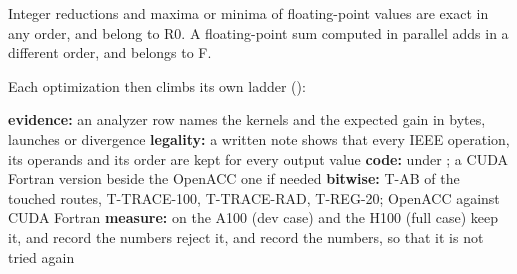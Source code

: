 Integer reductions and maxima or minima of floating-point values are exact in any order, and belong to R0. A
floating-point sum computed in parallel adds in a different order, and belongs to F.

Each optimization then climbs its own ladder ():
\begin{algorithm}[ht]
\caption{The optimization ladder of Stage 6.}
\label{alg:optladder}
\begin{algorithmic}[1]
\State \textbf{evidence:} an analyzer row names the kernels and the expected gain in bytes, launches or divergence
\State \textbf{legality:} a written note shows that every IEEE operation, its operands and its order are kept for every output value
\State \textbf{code:} under ; a CUDA Fortran version beside the OpenACC one if needed
\State \textbf{bitwise:} T-AB of the touched routes, T-TRACE-100, T-TRACE-RAD, T-REG-20; OpenACC against CUDA Fortran
\State \textbf{measure:} on the A100 (dev case) and the H100 (full case)
  \State keep it, and record the numbers
\Else
  \State reject it, and record the numbers, so that it is not tried again
\EndIf
\end{algorithmic}
\end{algorithm}
